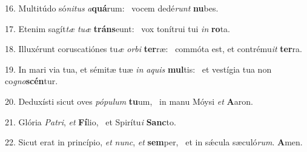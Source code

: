 16. Multitúdo só\textit{ni}\textit{tus} \textit{a}\textbf{quá}rum: \ast\  vocem dedé\textit{runt} \textbf{nu}bes.\

17. Etenim sagít\textit{tæ} \textit{tu}\textit{æ} \textbf{tráns}eunt: \ast\  vox tonítrui tui \textit{in} \textbf{ro}ta.\

18. Illuxérunt coruscatiónes tu\textit{æ} \textit{or}\textit{bi} \textbf{ter}ræ: \ast\  commóta est, et contrému\textit{it} \textbf{ter}ra.\

19. In mari via tua, et sémitæ tuæ \textit{in} \textit{a}\textit{quis} \textbf{mul}tis: \ast\  et vestígia tua non co\textit{gno}\textbf{scén}tur.\

20. Deduxísti sicut oves \textit{pó}\textit{pu}\textit{lum} \textbf{tu}um, \ast\  in manu Móysi \textit{et} \textbf{A}aron.\

21. Glória \textit{Pa}\textit{tri}, \textit{et} \textbf{Fí}lio, \ast\  et Spirítu\textit{i} \textbf{Sanc}to.\

22. Sicut erat in princípio, \textit{et} \textit{nunc}, \textit{et} \textbf{sem}per, \ast\  et in sǽcula sæculó\textit{rum}. \textbf{A}men.\

